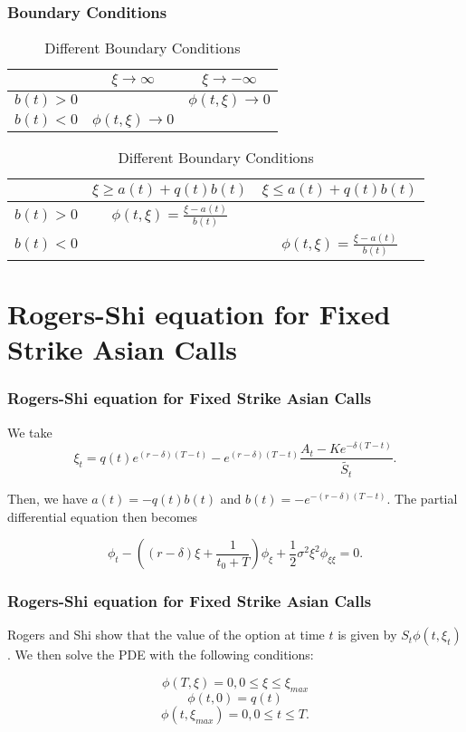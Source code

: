 \documentclass{beamer}
\begin{document}
  \begin{frame}
    \frametitle{Boundary Conditions}
    \begin{table}[h]
      \begin{tabular}{|c|c|c|}
        \hline
        & \(\xi \rightarrow \infty\) & \(\xi \rightarrow -\infty\) \\
        \hline
        \(b(t) > 0\) &  & \(\phi(t, \xi) \rightarrow 0\) \\
        \(b(t) < 0\) & \(\phi(t, \xi) \rightarrow 0\) & \\
        \hline
      \end{tabular}
      \begin{tabular}{|c|c|c|}
        \hline
        & \(\xi \ge a(t) + q(t)b(t)\) & \(\xi \le a(t) + q(t)b(t)\) \\
        \hline
        \(b(t) > 0\) & \(\phi(t, \xi) = \frac{\xi-a(t)}{b(t)} \) & \\
        \(b(t) < 0\) &  & \( \phi(t, \xi) = \frac{\xi-a(t)}{b(t)} \) \\
        \hline
      \end{tabular}
      \caption{Different Boundary Conditions}
    \end{table}
  \end{frame}

  \section{Rogers-Shi equation for Fixed Strike Asian Calls}

  \begin{frame}
    \frametitle{Rogers-Shi equation for Fixed Strike Asian Calls}
    We take
    \begin{equation}
      \xi_t = q(t)e^{(r-\delta)(T-t)} - e^{(r-\delta)(T-t)}\frac{A_t - Ke^{-\delta(T-t)}}{\tilde{S_t}}.
    \end{equation}

    Then, we have \( a(t) = -q(t)b(t) \) and \(b(t) = -e^{-(r-\delta)(T-t)}\). The partial differential equation then becomes

    \begin{equation}
      \phi_t - ( (r-\delta)\xi + \frac{1}{t_0 + T} ) \phi_\xi + \frac{1}{2}\sigma^2\xi^2\phi_{\xi\xi} = 0.
    \end{equation}
  \end{frame}

  \begin{frame}
    \frametitle{Rogers-Shi equation for Fixed Strike Asian Calls}
    Rogers and Shi show that the value of the option at time \(t\) is given by \(S_t\phi(t, \xi_t)\). We then solve the PDE with the following conditions:

    \begin{equation}
      \phi(T, \xi) = 0, 0 \le \xi \le \xi_{max}
    \end{equation}
    \begin{equation}
      \phi(t, 0) = q(t)
    \end{equation}
    \begin{equation}
      \phi(t, \xi_{max}) = 0, 0 \le t \le T.
    \end{equation}
  \end{frame}
\end{document}
